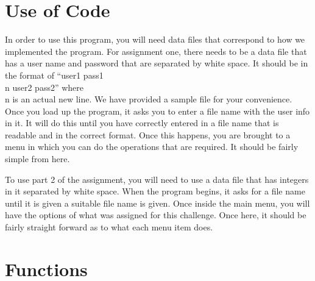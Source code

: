 \documentclass[pdftex, 12pt]{article}
\begin{document}
\section{Use of Code}

In order to use this program, you will need data files that correspond to how we implemented the program. For assignment
one, there needs to be a data file that has a user name and password that are separated by white space. It should be in
the format of ``user1 pass1 \\n user2 pass2'' where \\n is an actual new line. We have provided a sample file for your
convenience. Once you load up the program, it asks you to enter a file name with the user info in it. It will do this
until you have correctly entered in a file name that is readable and in the correct format. Once this happens, you are
brought to a menu in which you can do the operations that are required. It should be fairly simple from here.

To use part 2 of the assignment, you will need to use a data file that has integers in it separated by white space. When
the program begins, it asks for a file name until it is given a suitable file name is given. Once inside the main menu,
you will have the options of what was assigned for this challenge. Once here, it should be fairly straight forward as to
what each menu item does.
\section{Functions}

\end{document}
